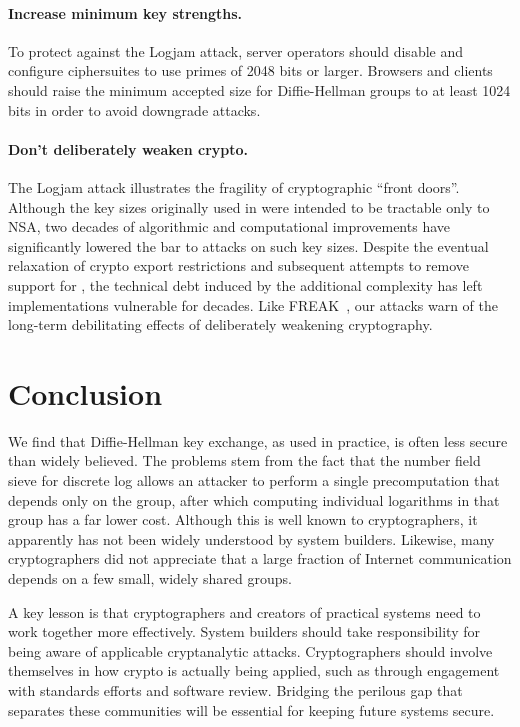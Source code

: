 \paragraph{Increase minimum key strengths.}
To protect against the Logjam attack, server operators should disable \dheexp
and configure \dhe ciphersuites to use primes of 2048 bits or larger.
Browsers and clients should raise the minimum accepted size for
Diffie-Hellman groups to at least 1024 bits in order to avoid downgrade attacks.

\paragraph{Don't deliberately weaken crypto.}
The Logjam attack
illustrates the fragility of cryptographic ``front doors''.
Although the key sizes originally used in \dheexp were intended
to be tractable only to NSA, two decades of algorithmic and computational
improvements have significantly lowered the bar to attacks on such key sizes.
Despite the eventual relaxation of crypto export restrictions and subsequent attempts to remove support for \dheexp{}, the
technical debt induced by the additional complexity has left implementations vulnerable for decades.
Like FREAK~\cite{beurdouche2015messy}, our attacks warn
of the long-term debilitating effects of deliberately weakening cryptography.


\section{Conclusion}
\label{sec:conclusion}

We find that Diffie-Hellman key exchange, as used in practice, is often less secure than
widely believed.  The problems stem from the fact that the number
field sieve for discrete log allows an attacker to perform a single
precomputation that depends only on the group, after which computing
individual logarithms in that group has a far lower cost.  Although this
is well known to cryptographers, it apparently has not been
widely understood by system builders.  Likewise, many cryptographers
did not appreciate that a large fraction of Internet
communication depends on a few
small, widely shared groups.

A key lesson is that cryptographers and
creators of practical systems need to work together more effectively.
System builders should take responsibility for being aware of
applicable cryptanalytic attacks. Cryptographers
should involve themselves in how crypto is actually being applied,
such as through engagement with standards efforts and software review.
Bridging the perilous gap that separates these communities will be
essential for keeping future systems secure.

